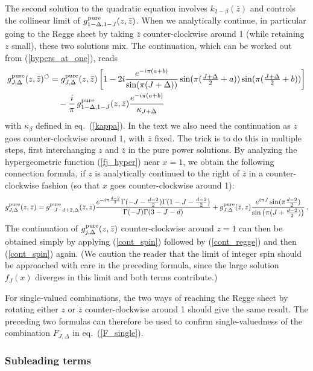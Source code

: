 \documentclass[11pt, reqno,preprint]{article}
\def\be{\begin{equation}}
\def\ee{\end{equation}}
\def\gpure{g^{\rm pure}}
\def\zbar{\bar{z}}
\def\j{J}
\begin{document}
\begin{appendix}
The second solution to the quadratic equation involves $k_{2-\beta}(\zbar)$
and controls the collinear limit of $\gpure_{1-\Delta,1-\j}(z,\zbar)$.
When we analytically continue, in particular going to the Regge sheet by taking $\zbar$ counter-clockwise around 1
(while retaining $z$ small), these two solutions mix.
The continuation, which can be worked out from (\ref{hypers_at_one}), reads
\be\begin{aligned}
 \gpure_{\j,\Delta}(z,\zbar)^{\circlearrowleft} &=  \gpure_{\j,\Delta}(z,\zbar)\left[1 -2i\frac{e^{-i\pi(a+b)}}{\sin(\pi (\j+\Delta))}\sin(\pi(\tfrac{\j+\Delta}{2}+a))\sin(\pi(\tfrac{\j{+}\Delta}{2}+b))\right]
\\ & \quad- \frac{i}{\pi} \,\gpure_{1-\Delta,1-\j}(z,\zbar)\frac{e^{-i\pi(a+b)}}{\kappa_{\j{+}\Delta}} \label{cont_regge}
\end{aligned}\ee
with $\kappa_\beta$ defined in eq.~(\ref{kappa}).
In the text we also need the continuation as $z$ goes counter-clockwise around $1$, with $\zbar$ fixed.
The trick is to do this in multiple steps, first interchanging $z$ and $\zbar$ in the pure power solutions.
By analyzing the hypergeometric function (\ref{fj_hyper}) near $x=1$,
we obtain the following connection formula, if $z$ is analytically continued
to the right of $\zbar$ in a counter-clockwise fashion (so that $x$ goes counter-clockwise around 1):
\be
 \gpure_{\j,\Delta}(z,\zbar) = \gpure_{-\j-d+2,\Delta}(\zbar,z) \frac{e^{-i\pi\frac{d-2}{2}}\Gamma(-\j-\tfrac{d-2}{2})\Gamma(1-\j-\tfrac{d-2}{2})}{\Gamma(-\j)\Gamma(3-\j-d)} + \gpure_{\j,\Delta}(\zbar,z)\frac{e^{i\pi \j}\sin(\pi\tfrac{d-2}{2})}{\sin\big(\pi(\j+\tfrac{d-2}{2})\big)}\,. \label{cont_spin}
\ee
The continuation of $\gpure_{j,\Delta}(z,\zbar)$ counter-clockwise around $z=1$ can then be obtained simply
by applying (\ref{cont_spin}) followed by (\ref{cont_regge}) and then (\ref{cont_spin}) again.
(We caution the reader that the limit of integer spin should be approached with care in the preceding formula,
since the large solution $f_\j(x)$ diverges in this limit and both terms contribute.)

For single-valued combinations, the two ways of reaching the Regge sheet by rotating either $z$ or $\zbar$ counter-clockwise around 1
should give the same result. The preceding two formulas can therefore be used to confirm single-valuedness of the combination
$F_{\j,\Delta}$ in eq.~(\ref{F_single}).

\subsubsection*{Subleading terms}


\end{appendix}
\end{document}
